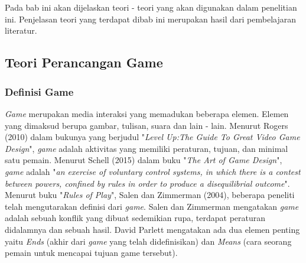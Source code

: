 \chapter{\babDua}
Pada bab ini akan dijelaskan teori - teori yang akan digunakan dalam penelitian ini. Penjelasan teori yang terdapat dibab ini merupakan hasil dari pembelajaran literatur.
\section{Teori Perancangan Game}
	\subsection{Definisi Game}
	\textit{Game} merupakan media interaksi yang memadukan beberapa elemen. Elemen yang dimaksud berupa gambar, tulisan, suara dan lain - lain. Menurut Rogers (2010) dalam bukunya yang berjudul "\textit{Level Up:The Guide To Great Video Game Design}", \textit{game} adalah aktivitas yang memiliki peraturan, tujuan, dan minimal satu pemain. Menurut Schell (2015) dalam buku "\textit{The Art of Game Design}", \textit{game} adalah "\textit{an exercise of voluntary control systems, in which there is a contest between powers, confined by rules in order to produce a disequilibrial outcome}".
	\linebreak\linebreak
	Menurut buku "\textit{Rules of Play}", Salen dan Zimmerman (2004), beberapa peneliti telah mengutarakan definisi dari \textit{game}. Salen dan Zimmerman mengatakan \textit{game} adalah sebuah konflik yang dibuat sedemikian rupa, terdapat peraturan didalamnya dan sebuah hasil. David Parlett mengatakan ada dua elemen penting yaitu \textit{Ends} (akhir dari  \textit{game} yang telah didefinisikan) dan \textit{Means} (cara seorang pemain untuk mencapai tujuan game tersebut).
